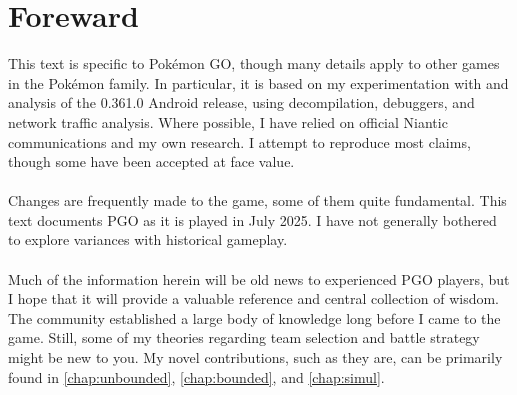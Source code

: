 \chapter{Foreward}

\noindent{}This text is specific to Pokémon GO, though many details
apply to other games in the Pokémon family.
In particular, it is based on my experimentation with and analysis of
 the 0.361.0 Android release, using decompilation, debuggers, and
 network traffic analysis.
Where possible, I have relied on official Niantic communications
 and my own research.
I attempt to reproduce most claims, though some have been accepted at face value.\\
\\
\noindent{}Changes are frequently made to the game, some of them quite fundamental.
This text documents PGO as it is played in July 2025.
I have not generally bothered to explore variances with historical gameplay.\\
\\
\noindent{}Much of the information herein will be old news to experienced
 PGO players, but I hope that it will provide a valuable reference and central collection of wisdom.
The community established a large body of knowledge long before I
 came to the game.
Still, some of my theories regarding team selection and battle strategy might
  be new to you.
My novel contributions, such as they are, can be primarily found in
  \autoref{chap:unbounded}, \autoref{chap:bounded}, and \autoref{chap:simul}.
